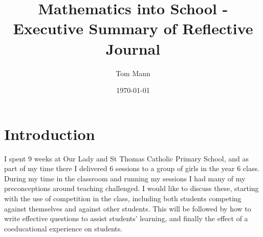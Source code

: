 \documentclass[11pt, a4paper, notitlepage]{article}
\title{Mathematics into School - Executive Summary of Reflective Journal}
\author{Tom Mann}
\date{\today}
\begin{document}
\maketitle

\section*{Introduction}
I spent 9 weeks at Our Lady and St Thomas Catholic Primary School, and as part of my time there I delivered 6 sessions to a group of girls in the year 6 class. During my time in the classroom and running my sessions I had many of my preconceptions around teaching challenged. I would like to discuss these, starting with the use of competition in the class, including both students competing against themselves and against other students. This will be followed by how to write effective questions to assist students' learning, and finally the effect of a coeducational experience on students.
\end{document}

